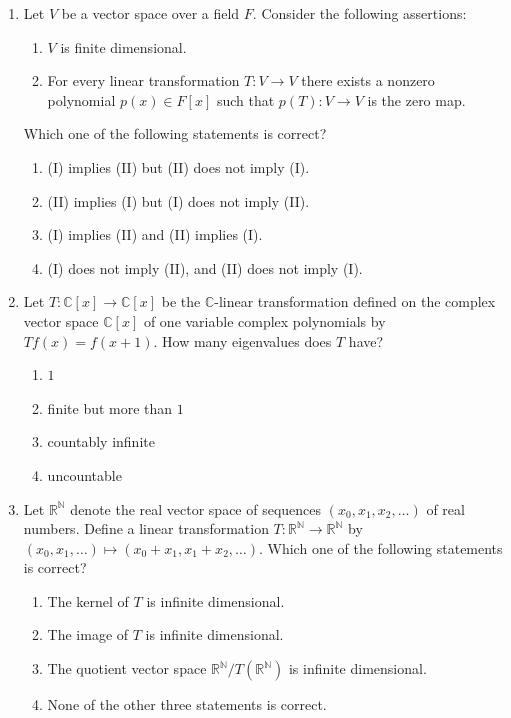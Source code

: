 \documentclass[11pt, a4paper]{article}
\begin{document}
\begin{enumerate}
  \item Let $V$ be a vector space over a field $F$. Consider the following assertions:
  \begin{enumerate}[label=(\Roman*)]
    \item $V$ is finite dimensional.
    \item For every linear transformation $T: V \to V$ there exists a nonzero polynomial $p(x) \in F[x]$ such that $p(T): V \to V$ is the zero map.
  \end{enumerate}
  Which one of the following statements is correct?
  \begin{enumerate}[label=(\alph*)]
    \item (I) implies (II) but (II) does not imply (I).
    \item (II) implies (I) but (I) does not imply (II).
    \item (I) implies (II) and (II) implies (I).
    \item (I) does not imply (II), and (II) does not imply (I).
  \end{enumerate}

  \item Let $T: \mathbb{C}[x] \to \mathbb{C}[x]$ be the $\mathbb{C}$-linear transformation defined on the complex vector space $\mathbb{C}[x]$ of one variable complex polynomials by $Tf(x) = f(x+1)$. How many eigenvalues does $T$ have?
  \begin{enumerate}[label=(\alph*)]
    \item $1$
    \item finite but more than $1$
    \item countably infinite
    \item uncountable
  \end{enumerate}

  \item Let $\mathbb{R}^{\mathbb{N}}$ denote the real vector space of sequences $(x_0, x_1, x_2, \dots)$ of real numbers. Define a linear transformation $T: \mathbb{R}^{\mathbb{N}} \to \mathbb{R}^{\mathbb{N}}$ by $(x_0, x_1, \dots) \mapsto (x_0 + x_1, x_1 + x_2, \dots)$. Which one of the following statements is correct?
  \begin{enumerate}[label=(\alph*)]
    \item The kernel of $T$ is infinite dimensional.
    \item The image of $T$ is infinite dimensional.
    \item The quotient vector space $\mathbb{R}^{\mathbb{N}}/T(\mathbb{R}^{\mathbb{N}})$ is infinite dimensional.
    \item None of the other three statements is correct.
  \end{enumerate}


\end{enumerate}
\end{document}
